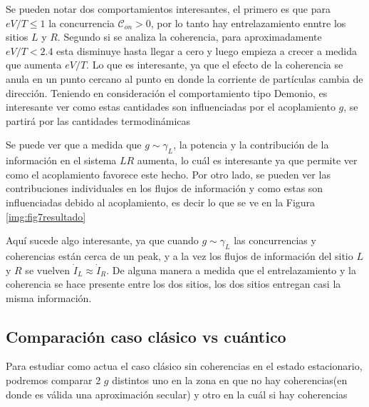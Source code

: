 Se pueden notar dos comportamientos interesantes, el primero es que para $eV/T \leq 1$ la concurrencia $\mathcal{C}_{on}>0$, por lo tanto hay entrelazamiento enntre los sitios $L$ y $R$. Segundo si se analiza la coherencia, para aproximadamente $eV/T<2.4$ esta disminuye hasta llegar a cero y luego empieza a crecer a medida que aumenta $eV/T$. Lo que es interesante, ya que el efecto de la coherencia se anula en un punto cercano al punto en donde la corriente de partículas cambia de dirección. Teniendo en consideración el comportamiento tipo Demonio, es interesante ver como estas cantidades son influenciadas por el acoplamiento $g$, se partirá por las cantidades termodinámicas 


Se puede ver que a medida que $g\sim \gamma_{L}$, la potencia y la contribución de la información en el sistema $LR$ aumenta, lo cuál es interesante ya que permite ver como el acoplamiento favorece este hecho. Por otro lado, se pueden ver las contribuciones individuales en los flujos de información y como estas son influenciadas debido al acoplamiento, es decir lo que se ve en la Figura \ref{img:fig7resultado}


Aquí sucede algo interesante, ya que cuando $g\sim \gamma_{L}$ las concurrencias y coherencias están cerca de un peak, y a la vez los flujos de información del sitio $L$ y $R$ se vuelven $\dot{I}_{L} \approx \dot{I}_{R}$. De alguna manera a medida que el entrelazamiento y la coherencia se hace presente entre los dos sitios, los dos sitios entregan casi la misma información.

\label{sec5:demonio}

\newpage 

\subsection{Comparación caso clásico vs cuántico}
Para estudiar como actua el caso clásico sin coherencias en el estado estacionario, podremos comparar 2 $g$ distintos uno en la zona en que no hay coherencias(en donde es válida una aproximación secular) y otro en la cuál si hay coherencias


